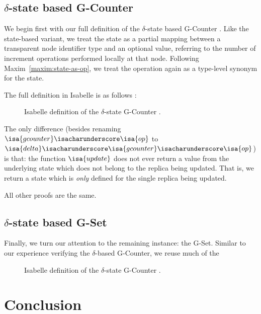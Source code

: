\subsection{$\delta$-state based G-Counter}

We begin first with our full definition of the $\delta$-state based G-Counter
\CRDT. Like the state-based variant, we treat the state as a partial mapping
between a transparent node identifier type and an optional value, referring to
the number of increment operations performed locally at that node. Following
Maxim~\ref{maxim:state-as-op}, we treat the operation again as a type-level
synonym for the state.

The full definition in Isabelle is as follows \TODO[spacing]:

\begin{figure}[H]
  
  \caption{Isabelle definition of the $\delta$-state G-Counter \CRDT.}
\end{figure}

The only difference (besides renaming $\isa{gcounter}\isacharunderscore\isa{op}$
to $\isa{delta}\isacharunderscore\isa{gcounter}\isacharunderscore\isa{op}$) is
that: the function $\isa{update}$ does not ever return a value from the
underlying state which does not belong to the replica being updated. That is, we
return a state which is \emph{only} defined for the single replica being
updated.

All other proofs are the same. 

\subsection{$\delta$-state based G-Set}

Finally, we turn our attention to the remaining \CRDT instance: the G-Set.
Similar to our experience verifying the $\delta$-based G-Counter, we reuse much
of the

\begin{figure}[H]
  
  \caption{Isabelle definition of the $\delta$-state G-Counter \CRDT.}
\end{figure}


\section{Conclusion}

\TODO
